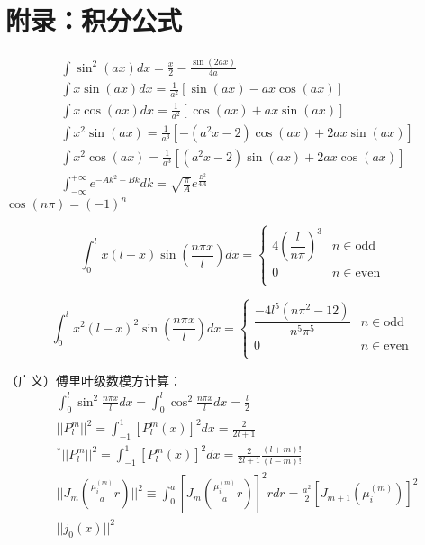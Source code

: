 \newpage
\appendices
\section*{附录：积分公式}

$$\begin{aligned}
    &\int \sin^2(ax)dx=\frac{x}{2}-\frac{\sin(2ax)}{4a}\\
    &\int x\sin(ax)dx=\frac{1}{a^2}[\sin(ax)-ax\cos(ax)]\\
    &\int x\cos (ax)dx=\frac{1}{a^2}[\cos(ax)+ax\sin(ax)]\\
    &\int x^2\sin(ax)=\frac{1}{a^3}[-(a^2x-2)\cos(ax)+2ax\sin(ax)]\\
    &\int x^2\cos(ax)=\frac{1}{a^3}[(a^2x-2)\sin(ax)+2ax\cos(ax)]\\
    &\int_{-\infty}^{+\infty}e^{-Ak^{2}-Bk}dk=\sqrt{\frac{\pi}{A}}e^{\frac{B^2}{4A}}
\end{aligned}$$
$\cos(n\pi)=(-1)^n$


$$
\int_0^lx(l-x)\sin(\frac{n\pi x}{l})dx=
\begin{cases}
    4\left(\dfrac{l}{n\pi}\right)^3& n\in\text{odd}\\
    0&n\in\text{even}\\
\end{cases}$$

$$\int_0^lx^2(l-x)^2\sin(\frac{n\pi x}{l})dx=
\begin{cases}
\dfrac{-4l^5(n\pi^2-12)}{n^5\pi^5}& n\in\text{odd}\\
0&n\in\text{even}\\
\end{cases}$$




（广义）傅里叶级数模方计算：
$$\begin{aligned}
    &\int_0^l\sin^2\frac{n\pi x}{l}dx=\int_0^l\cos^2\frac{n\pi x}{l}dx=\frac{l}{2}\\
    &||P_{l}^{m}||^{2}=\int_{-1}^{1}[P_{l}^{m}(x)]^{2}dx=\frac{2}{2l+1}\\
    &^*||P_{l}^{m}||^{2}=\int_{-1}^{1}[P_{l}^{m}(x)]^{2}dx=\frac{2}{2l+1}\frac{(l+m)!}{(l-m)!}\\
    &\bigg|\bigg|J_{m}\left(\frac{\mu_{i}^{(m)}}{a}r\right)\bigg|\bigg|^{2}
        \equiv\int_{0}^{a}\left[J_{m}\left(\frac{\mu_{i}^{(m)}}{a}r\right)\right]^{2}rdr
        =\frac{a^{2}}{2}\left[J_{m+1}\left(\mu_{i}^{(m)}\right)\right]^{2}\\
    &||j_0(x)||^2
\end{aligned}$$
